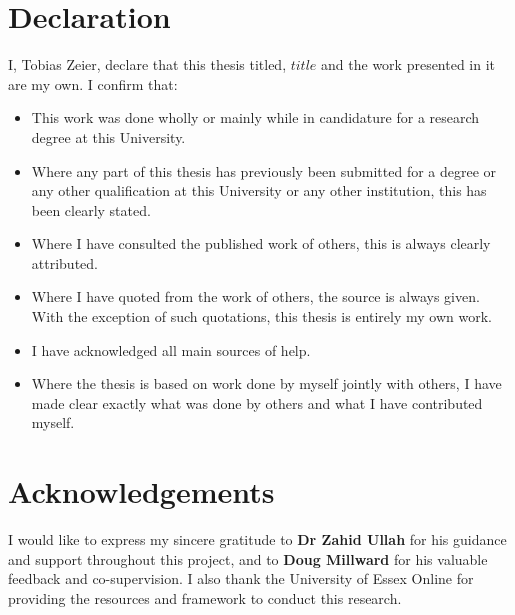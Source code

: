 \cleardoublepage


\chapter*{Declaration}

\noindent I, Tobias Zeier, declare that this thesis titled, $title$ and the work presented in it are my own. I confirm that:

\begin{itemize} 
\item This work was done wholly or mainly while in candidature for a research degree at this University.
\item Where any part of this thesis has previously been submitted for a degree or any other qualification at this University or any other institution, this has been clearly stated.
\item Where I have consulted the published work of others, this is always clearly attributed.
\item Where I have quoted from the work of others, the source is always given. With the exception of such quotations, this thesis is entirely my own work.
\item I have acknowledged all main sources of help.
\item Where the thesis is based on work done by myself jointly with others, I have made clear exactly what was done by others and what I have contributed myself.\\
\end{itemize}

\cleardoublepage


\chapter*{Acknowledgements}

I would like to express my sincere gratitude to \textbf{Dr Zahid Ullah} for his guidance and support throughout this project, and to \textbf{Doug Millward} for his valuable feedback and co-supervision. I also thank the University of Essex Online for providing the resources and framework to conduct this research.

